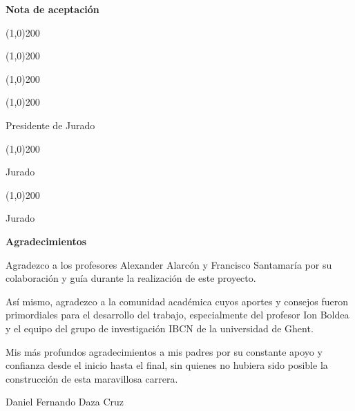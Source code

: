 \mbox{}
\thispagestyle{empty}
\newpage

\vspace{50pt}

\textbf{Nota de aceptación}
\vspace{10pt}

\line(1,0){200}

\line(1,0){200}

\line(1,0){200}

\vspace{50pt}

\line(1,0){200}

Presidente de Jurado

\vspace{50pt}

\line(1,0){200}

Jurado

\vspace{50pt}

\line(1,0){200}

Jurado
\newpage

\mbox{}
\thispagestyle{empty}
\newpage

\begin{large}
\textbf{Agradecimientos}
\end{large}

\vspace{10pt}
Agradezco a los profesores Alexander Alarcón y Francisco Santamaría por su colaboración y guía durante la realización de este proyecto.

\vspace{10pt}
Así mismo, agradezco a la comunidad académica cuyos aportes y consejos fueron primordiales para el desarrollo del trabajo, especialmente del profesor Ion Boldea y el equipo del grupo de investigación IBCN de la universidad de Ghent.

\vspace{10pt}
Mis más profundos agradecimientos a mis padres por su constante apoyo y confianza desde el inicio hasta el final, sin quienes no hubiera sido posible la construcción de esta maravillosa carrera.

\vspace{40pt}
Daniel Fernando Daza Cruz


\mbox{}
\thispagestyle{empty}
\newpage